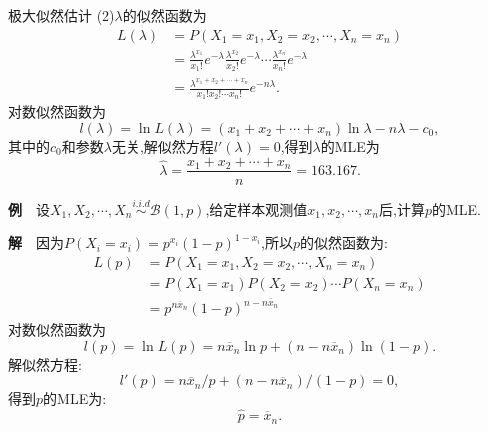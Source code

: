 	\begin{frame}{极大似然估计}
		(2)$\lambda$的似然函数为
		\begin{equation}
			\begin{split}
					L(\lambda) &= P(X_1 = x_1,X_2 = x_2,\cdots,X_n = x_n) \\
					&= \frac{\lambda^{x_1}}{x_1!}e^{-\lambda}\frac{\lambda^{x_2}}{x_2!}e^{-\lambda}\cdots\frac{\lambda^{x_n}}{x_n!}e^{-\lambda} \\
					&= \frac{\lambda^{x_1+x_2+\cdots+x_n}}{x_1!x_2!\cdots x_n!}e^{-n\lambda}.
			\end{split}
		\end{equation}
		对数似然函数为
		\begin{equation}
			l(\lambda) = \ln L(\lambda) = (x_1+x_2+\cdots+x_n)\ln \lambda-n\lambda-c_0,
		\end{equation}
		其中的$c_0$和参数$\lambda$无关,解似然方程$l'(\lambda) = 0$,得到$\lambda$的MLE为
		\begin{equation}
			\widehat{\lambda} = \frac{x_1+x_2+\cdots+x_n}{n} = 163.167.
		\end{equation}
	\end{frame}

	\begin{frame}
		\textbf{例}$\quad$设$X_1,X_2,\cdots,X_n\stackrel{i.i.d}{\sim}\mathcal{B}(1,p)$,给定样本观测值$x_1,x_2,\cdots,x_n$后,计算$p$的MLE.
		
		\textbf{解}$\quad$因为$P(X_i=x_i) = p^{x_i}(1-p)^{1-x_i}$,所以$p$的似然函数为:
		\begin{equation}
			\begin{split}
				L(p) &= P(X_1=x_1,X_2=x_2,\cdots,X_n=x_n) \\
				&= P(X_1=x_1)P(X_2=x_2)\cdots P(X_n=x_n) \\
				&= p^{n\overline{x}_n}(1-p)^{n-n\overline{x}_n}
			\end{split}
		\end{equation}
		对数似然函数为
		\begin{equation}
			l(p) = \ln L(p) = n\overline{x}_n\ln p + (n-n\overline{x}_n)\ln(1-p).
		\end{equation}
		解似然方程:
		\begin{equation}
			l'(p) = n\overline{x}_n/p + (n-n\overline{x}_n)/(1-p) = 0,
		\end{equation}
		得到$p$的MLE为:
		\begin{equation}
			\widehat{p} = \overline{x}_n.
		\end{equation}
	\end{frame}

